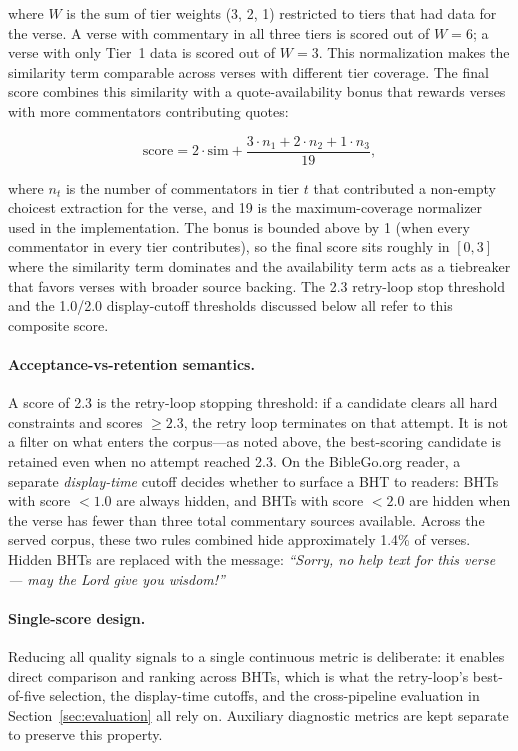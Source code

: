 \noindent where $W$ is the sum of tier weights (3, 2, 1) restricted to tiers that had data for the verse. A verse with commentary in all three tiers is scored out of $W=6$; a verse with only Tier~1 data is scored out of $W=3$. This normalization makes the similarity term comparable across verses with different tier coverage. The final score combines this similarity with a quote-availability bonus that rewards verses with more commentators contributing quotes:

\[
\text{score} = 2 \cdot \text{sim} + \frac{3 \cdot n_1 + 2 \cdot n_2 + 1 \cdot n_3}{19},
\]

\noindent where $n_t$ is the number of commentators in tier $t$ that contributed a non-empty choicest extraction for the verse, and 19 is the maximum-coverage normalizer used in the implementation. The bonus is bounded above by 1 (when every commentator in every tier contributes), so the final score sits roughly in $[0, 3]$ where the similarity term dominates and the availability term acts as a tiebreaker that favors verses with broader source backing. The 2.3 retry-loop stop threshold and the 1.0/2.0 display-cutoff thresholds discussed below all refer to this composite score.

\paragraph{Acceptance-vs-retention semantics.} A score of 2.3 is the retry-loop stopping threshold: if a candidate clears all hard constraints and scores $\geq 2.3$, the retry loop terminates on that attempt. It is not a filter on what enters the corpus---as noted above, the best-scoring candidate is retained even when no attempt reached 2.3. On the BibleGo.org reader, a separate \emph{display-time} cutoff decides whether to surface a BHT to readers: BHTs with score $< 1.0$ are always hidden, and BHTs with score $< 2.0$ are hidden when the verse has fewer than three total commentary sources available. Across the served corpus, these two rules combined hide approximately 1.4\% of verses. Hidden BHTs are replaced with the message: \textit{``Sorry, no help text for this verse --- may the Lord give you wisdom!''}

\paragraph{Single-score design.} Reducing all quality signals to a single continuous metric is deliberate: it enables direct comparison and ranking across BHTs, which is what the retry-loop's best-of-five selection, the display-time cutoffs, and the cross-pipeline evaluation in Section~\ref{sec:evaluation} all rely on. Auxiliary diagnostic metrics are kept separate to preserve this property.

